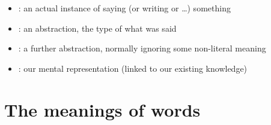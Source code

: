 \documentclass[a4paper,landscape,headrule,footrule,xetex]{foils}
\begin{document}
\begin{itemize}
\item {}: an actual instance of saying (or writing  or \ldots) something
\item {}: an abstraction, the type of what was said
  \begin{exe}
    \ex {}
  \end{exe}
\item {}: a further abstraction, normally ignoring some non-literal meaning
  \begin{exe}
    \ex {}
  \end{exe}
\item {}: our mental representation (linked to our
  existing knowledge)
\end{itemize}







\section{The meanings of words}
 \MyLogo{}
\end{document}
